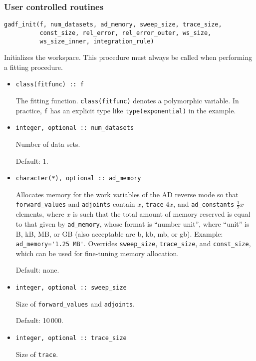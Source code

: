 \documentclass{article}
\begin{document}
\subsubsection{\label{sec:user}User controlled routines}

\begin{verbatim}
gadf_init(f, num_datasets, ad_memory, sweep_size, trace_size,
          const_size, rel_error, rel_error_outer, ws_size,
          ws_size_inner, integration_rule)
\end{verbatim}
Initializes the workspace. This procedure must always be called when performing a fitting procedure.
\begin{itemize}
\item
\begin{verbatim}
class(fitfunc) :: f
\end{verbatim}
  The fitting function. \verb+class(fitfunc)+ denotes a polymorphic variable. In practice, \texttt{f} has an explicit type like \verb+type(exponential)+ in the example.
\item
\begin{verbatim}
integer, optional :: num_datasets
\end{verbatim}
  Number of data sets.

  Default: 1.
\item
\begin{verbatim}
character(*), optional :: ad_memory
\end{verbatim}
  Allocates memory for the work variables of the AD reverse mode so that \verb+forward_values+ and \verb+adjoints+ contain $x$, \verb+trace+ $4x$, and \verb+ad_constants+ $\frac{1}{2}x$ elements, where $x$ is such that the total amount of memory reserved is equal to that given by \verb+ad_memory+, whose format is ``number unit'', where ``unit'' is B, kB, MB, or GB (also acceptable are b, kb, mb, or gb). Example: \verb+ad_memory='1.25 MB'+. Overrides \verb+sweep_size+, \verb+trace_size+, and \verb+const_size+, which can be used for fine-tuning memory allocation.

  Default: none.
\item
\begin{verbatim}
integer, optional :: sweep_size
\end{verbatim}
  Size of \verb+forward_values+ and \verb+adjoints+.

  Default: 10\,000.
\item
\begin{verbatim}
integer, optional :: trace_size
\end{verbatim}
  Size of \verb+trace+.


\end{itemize}
\end{document}
